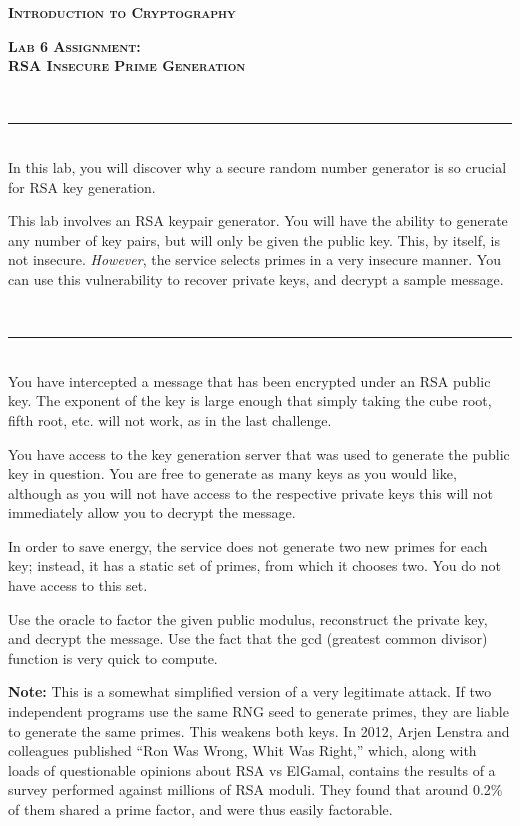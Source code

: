 \documentclass[11pt,oneside]{article}
\newcommand{\class}{Introduction to Cryptography}
\newcommand{\project}{Lab 6 Assignment:\\RSA Insecure Prime Generation}
\newcommand{\sectionfont}{phv} %
\newcommand{\bodyfont}{ppl} %
\renewcommand{\section}[1] {
    \vspace{12pt}{\quad\fontfamily{\sectionfont}\selectfont\Large\scshape\textbf{#1}}\\[-10pt]
    \vspace{8pt}\rule{\textwidth}{1pt}\\[-16pt]

}
\begin{document}
\fontfamily{\bodyfont} \selectfont \small
\thispagestyle{empty}
\begin{center}
    \fontfamily{\sectionfont}\selectfont\huge\scshape\textbf{\class}
\end{center}
\begin{center}
    \fontfamily{\sectionfont}\selectfont\large\scshape\textbf{\project}
\end{center}

\section{Overview}

In this lab, you will discover why a secure random number generator is so
crucial for RSA key generation.

This lab involves an RSA keypair generator. You will
have the ability to generate any number of key pairs, but will only be given the
public key. This, by itself, is not insecure.  \textit{However}, the service
selects primes in a very insecure manner. You can use this vulnerability to
recover private keys, and decrypt a sample message.

\section{Assignment}

You have intercepted a message that has been encrypted under an RSA public key.
The exponent of the key is large enough that simply taking the cube root, fifth
root, etc. will not work, as in the last challenge.

You have access to the key generation server that was used to generate the
public key in question. You are free to generate as many keys as you would like,
although as you will not have access to the respective private keys this will
not immediately allow you to decrypt the message.

In order to save energy, the service does not generate two new primes for each
key; instead, it has a static set of primes, from which it chooses two. You do
not have access to this set.

Use the oracle to factor the given public modulus, reconstruct the private key,
and decrypt the message. Use the fact that the gcd (greatest common divisor)
function is very quick to compute.

\textbf{Note:} This is a somewhat simplified version of a very legitimate
attack. If two independent programs use the same RNG seed to generate primes,
they are liable to generate the same primes. This weakens both keys. In 2012,
Arjen Lenstra and colleagues published ``Ron Was Wrong, Whit Was Right,'' which,
along with loads of questionable opinions about RSA vs ElGamal, contains the
results of a survey performed against millions of RSA moduli. They found that
around 0.2\% of them shared a prime factor, and were thus easily factorable.
\end{document}
